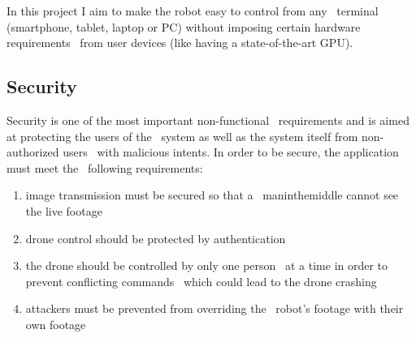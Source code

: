 In this project I aim to make the robot easy to control from any \
terminal (smartphone, tablet, laptop or PC) without imposing certain hardware requirements \
from user devices (like having a state-of-the-art GPU).

\subsection{Security}
\label{subsec:specification-security}
Security is one of the most important non-functional \
requirements and is aimed at protecting the users of the \
system as well as the system itself from non-authorized users \
with malicious intents.
In order to be secure, the application must meet the \
following requirements:
\begin{enumerate}
    \item image transmission must be secured so that a \
        man\-in\-the\-middle cannot see the live footage
    \item drone control should be protected by authentication
    \item the drone should be controlled by only one person \
        at a time in order to prevent conflicting commands \
        which could lead to the drone crashing
    \item attackers must be prevented from overriding the \
        robot's footage with their own footage
\end{enumerate}
